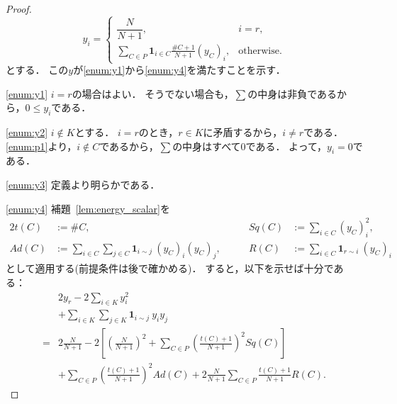 \begin{proof}
  \begin{equation}
    y_i = \begin{cases}
      \dfrac{N}{N + 1}, & i = r,\\
      \displaystyle \sum_{C \in P} \bm{1}_{i \in C} \frac{\# C + 1}{N + 1} (y_C)_i, & \text{otherwise}.
    \end{cases}
  \end{equation}
  とする．
  この$y$が\ref{enum:y1}から\ref{enum:y4}を満たすことを示す．

  \ref{enum:y1} $i = r$の場合はよい．
  そうでない場合も，$\sum$の中身は非負であるから，$0 \le y_i$である．

  \ref{enum:y2} $i \notin K$とする．
  $i = r$のとき，$r \in K$に矛盾するから，$i \ne r$である．
  \ref{enum:p1}より，$i \notin C$であるから，$\sum$の中身はすべて$0$である．
  よって，$y_i = 0$である．

  \ref{enum:y3} 定義より明らかである．

  \ref{enum:y4} 補題~\ref{lem:energy_scalar}を
  \begin{alignat}{2}
    t(C) &:= \# C, & Sq(C) &:= \sum_{i \in C} (y_C)_i ^ 2, \\
    Ad(C) &:= \sum_{i \in C} \sum_{j \in C} \bm{1}_{i \sim j}\ (y_C)_i (y_C)_j,\qquad & R(C) &:= \sum_{i \in C} \bm{1}_{r \sim i}\ (y_C)_i
  \end{alignat}
  として適用する(前提条件は後で確かめる)．
  すると，以下を示せば十分である：
  \begin{equation} \label{eq:y4_ETS}
    \begin{split}
      & 2 y_r - 2 \sum_{i \in K} y_i ^ 2 \\
      & + \sum_{i \in K} \sum_{j \in K} \bm{1}_{i \sim j}\ y_i y_j \\
      ={} & 2 \frac{N}{N + 1}
      - 2 \left[ \left( \frac{N}{N + 1} \right) ^ 2 + \sum_{C \in P} \left( \frac{t(C) + 1}{N + 1} \right) ^ 2 Sq(C) \right] \\
      & + \sum_{C \in P} \left( \frac{t(C) + 1}{N + 1} \right) ^ 2 Ad(C) + 2 \frac{N}{N + 1} \sum_{C \in P} \frac{t(C) + 1}{N + 1} R(C).
    \end{split}
  \end{equation}
  

\end{proof}
